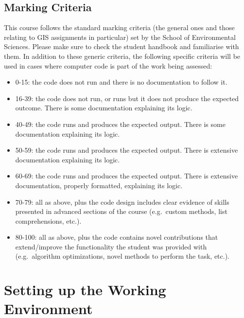 \documentclass[
  letterpaper,
  DIV=11,
  numbers=noendperiod]{scrreprt}
\providecommand{\tightlist}{%
  \setlength{\itemsep}{0pt}\setlength{\parskip}{0pt}}\usepackage{longtable,booktabs,array}
\begin{document}
\section*{Marking Criteria}\label{marking-criteria}


This course follows the standard marking criteria (the general ones and
those relating to GIS assignments in particular) set by the School of
Environmental Sciences. Please make sure to check the student handbook
and familiarise with them. In addition to these generic criteria, the
following specific criteria will be used in cases where computer code is
part of the work being assessed:

\begin{itemize}
\tightlist
\item
  0-15: the code does not run and there is no documentation to follow
  it.
\item
  16-39: the code does not run, or runs but it does not produce the
  expected outcome. There is some documentation explaining its logic.
\item
  40-49: the code runs and produces the expected output. There is some
  documentation explaining its logic.
\item
  50-59: the code runs and produces the expected output. There is
  extensive documentation explaining its logic.
\item
  60-69: the code runs and produces the expected output. There is
  extensive documentation, properly formatted, explaining its logic.
\item
  70-79: all as above, plus the code design includes clear evidence of
  skills presented in advanced sections of the course (e.g.~custom
  methods, list comprehensions, etc.).
\item
  80-100: all as above, plus the code contains novel contributions that
  extend/improve the functionality the student was provided with
  (e.g.~algorithm optimizations, novel methods to perform the task,
  etc.).
\end{itemize}


\chapter*{Setting up the Working
Environment}\label{setting-up-the-working-environment}
\end{document}
